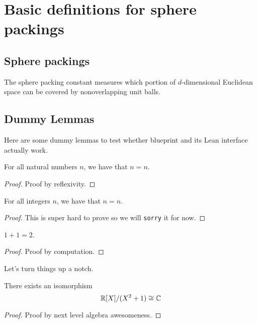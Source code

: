 %

\section{Basic definitions for sphere packings}
\subsection{Sphere packings}
The sphere packing constant measures which portion of $d$-dimensional Euclidean space can be covered by nonoverlapping unit balls.

\subsection{Dummy Lemmas}

Here are some dummy lemmas to test whether blueprint and its Lean interface actually work.

\begin{lemma}\label{foo1}\leanok
  For all natural numbers $n$, we have that $n = n$.
\end{lemma}
\begin{proof}
  \leanok
  Proof by reflexivity.
\end{proof}

\begin{lemma}\label{foo2}\leanok
  For all integers $n$, we have that $n = n$.
\end{lemma}
\begin{proof}
  This is super hard to prove so we will \verb|sorry| it for now.
\end{proof}

\begin{lemma}\label{foo3}\leanok
  $1 + 1 = 2$.
\end{lemma}
\begin{proof}
  \leanok
  Proof by computation.
\end{proof}

Let's turn things up a notch.

\begin{lemma}\label{foo4}\leanok  %
  There exists an isomorphism
  \[
    \mathbb{R}[X] / (X^2 + 1) \cong \mathbb{C}
  \]
\end{lemma}
\begin{proof}
  \leanok
  Proof by next level algebra awesomeness.
\end{proof}
